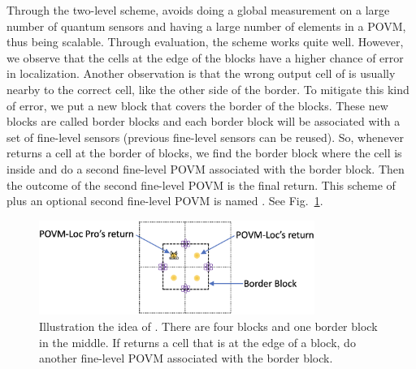  Through the two-level scheme, \povm avoids doing a global measurement on a large number of quantum sensors and having a large number of elements in a POVM, thus being scalable. 
Through evaluation, the scheme works quite well. However, we observe that the cells at the edge of the blocks have a higher chance of error in localization.
Another observation is that the wrong output cell of \povm is usually nearby to the correct cell, like the other side of the border.
To mitigate this kind of error, we put a new block that covers the border of the blocks.
These new blocks are called border blocks and each border block will be associated with a set of fine-level sensors (previous fine-level sensors can be reused).
So, whenever \povm returns a cell at the border of blocks, we find the border block where the cell is inside and do a second fine-level POVM associated with the border block.
Then the outcome of the second fine-level POVM is the final return.
This scheme of \povm plus an optional second fine-level POVM is named \povmpro.
See Fig.~\ref{fig:povmloc-pro}.


\begin{figure}[t]
    \centering
    \includegraphics[width=0.8\textwidth]{chapters/icc/figures/povm-loc-pro.png}
    \caption{Illustration the idea of \povmpro. There are four blocks and one border block in the middle. 
    If \povm returns a cell that is at the edge of a block, do another fine-level POVM associated with the border block.}
    \label{fig:povmloc-pro}
\end{figure}


